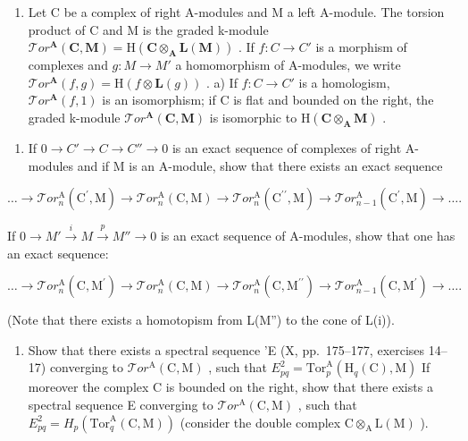\begin{enumerate}
\def\labelenumi{\arabic{enumi})}
\setcounter{enumi}{6}
\tightlist
\item
  Let C be a complex of right A-modules and M a left A-module. The torsion product of C and M is the graded k-module \(\mathcal{T}or^{\mathbf{A}}(\mathbf{C},\mathbf{M})=\mathrm{H}(\mathbf{C}\otimes_{\mathbf{A}}\mathbf{L}(\mathbf{M}))\) . If \(f:C\to C'\) is a morphism of complexes and \(g:M\to M'\) a homomorphism of A-modules, we write \(\mathcal{T}or^{\mathbf{A}}(f,g)=\mathrm{H}(f\otimes\mathbf{L}(g))\) . a) If \(f:C\to C'\) is a homologism, \(\mathcal{T}or^{\mathbf{A}}(f,1)\) is an isomorphism; if C is flat and bounded on the right, the graded k-module \(\mathcal{T}or^{\mathbf{A}}(\mathbf{C},\mathbf{M})\) is isomorphic to \(\mathrm{H}(\mathbf{C}\otimes_{\mathbf{A}}\mathbf{M})\) .
\end{enumerate}

\begin{enumerate}
\def\labelenumi{\alph{enumi})}
\setcounter{enumi}{1}
\tightlist
\item
  If \(0 \to C' \to C \to C'' \to 0\) is an exact sequence of complexes of right A-modules and if M is an A-module, show that there exists an exact sequence
\end{enumerate}

\[
\dots \rightarrow \mathcal {T} o r _ {n} ^ {\mathrm{A}} (\mathrm{C} ^ {\prime}, \mathrm{M}) \rightarrow \mathcal {T} o r _ {n} ^ {\mathrm{A}} (\mathrm{C}, \mathrm{M}) \rightarrow \mathcal {T} o r _ {n} ^ {\mathrm{A}} (\mathrm{C} ^ {\prime \prime}, \mathrm{M}) \rightarrow \mathcal {T} o r _ {n - 1} ^ {\mathrm{A}} (\mathrm{C} ^ {\prime}, \mathrm{M}) \rightarrow \dots .
\]

If \(0 \to M' \xrightarrow{i} M \xrightarrow{p} M'' \to 0\) is an exact sequence of A-modules, show that one has an exact sequence:

\[
\dots \rightarrow \mathcal {T} o r _ {n} ^ {\mathrm{A}} (\mathrm{C}, \mathrm{M} ^ {\prime}) \rightarrow \mathcal {T} o r _ {n} ^ {\mathrm{A}} (\mathrm{C}, \mathrm{M}) \rightarrow \mathcal {T} o r _ {n} ^ {\mathrm{A}} (\mathrm{C}, \mathrm{M} ^ {\prime \prime}) \rightarrow \mathcal {T} o r _ {n - 1} ^ {\mathrm{A}} (\mathrm{C}, \mathrm{M} ^ {\prime}) \rightarrow \dots .
\]

(Note that there exists a homotopism from L(M'') to the cone of L(i)).

\begin{enumerate}
\def\labelenumi{\alph{enumi})}
\setcounter{enumi}{2}
\tightlist
\item
  Show that there exists a spectral sequence 'E (X, pp.~175–177, exercises 14–17) converging to \(\mathcal{T}or^{\mathrm{A}}(\mathrm{C},\mathrm{M})\) , such that \(E_{pq}^{2} = \mathrm{Tor}_{p}^{\mathrm{A}}(\mathrm{H}_{q}(\mathrm{C}),\mathrm{M})\) If moreover the complex C is bounded on the right, show that there exists a spectral sequence E converging to \(\mathcal{T}or^{\mathrm{A}}(\mathrm{C},\mathrm{M})\) , such that \(E_{pq}^{2} = H_{p}(\mathrm{Tor}_{q}^{\mathrm{A}}(\mathrm{C},\mathrm{M}))\) (consider the double complex \(\mathrm{C}\otimes_{\mathrm{A}}\mathrm{L}(\mathrm{M})\) ).
\end{enumerate}

